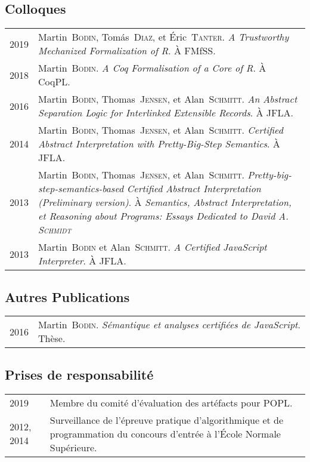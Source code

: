 \documentclass[12pt,a4paper]{article}
\makeatletter
\newenvironment{datecvsection}[1]%
               {\subsection*{#1}%
                 \noindent \begin{tabular}{@{}p{\annee}p{\texte}@{}}}
               {\end{tabular}}
\newcommand\familyName{\textsc}
\newcommand\placeName{}
\makeatother
\begin{document}
\begin{datecvsection}{Colloques}

  2019 & Martin~\familyName{Bodin}, Tomás~\familyName{Diaz}, et Éric~\familyName{Tanter}. \textit{A Trustworthy Mechanized Formalization of R}. À FMfSS. \\

  2018 & Martin~\familyName{Bodin}. \textit{A Coq Formalisation of a Core of R}. À CoqPL. \\

  2016 & Martin~\familyName{Bodin}, Thomas~\familyName{Jensen}, et Alan~\familyName{Schmitt}. \textit{An Abstract Separation Logic for Interlinked Extensible Records}. À JFLA. \\

  2014 & Martin~\familyName{Bodin}, Thomas~\familyName{Jensen}, et Alan~\familyName{Schmitt}. \textit{Certified Abstract Interpretation with Pretty-Big-Step Semantics}. À JFLA. \\

  2013 & Martin~\familyName{Bodin}, Thomas~\familyName{Jensen}, et Alan~\familyName{Schmitt}. \textit{Pretty-big-step-semantics-based Certified Abstract Interpretation (Preliminary version)}. À \textit{Semantics, Abstract Interpretation, et Reasoning about Programs: Essays Dedicated to David A. \textsc{Schmidt}} \\ %

  2013 & Martin~\familyName{Bodin} et Alan~\familyName{Schmitt}. \textit{A Certified JavaScript Interpreter}. À JFLA. \\

\end{datecvsection}

\begin{datecvsection}{Autres Publications}

    2016 & Martin~\familyName{Bodin}. \textit{Sémantique et analyses certifiées de JavaScript}. Thèse. \\

\end{datecvsection}

\begin{datecvsection}{Prises de responsabilité}

    2019 & Membre du comité d’évaluation des artéfacts pour POPL. \\

    2012, 2014 & Surveillance de l’épreuve pratique d’algorithmique et de programmation du concours d’entrée à l’\placeName{École Normale Supérieure}.

\end{datecvsection}
\end{document}
